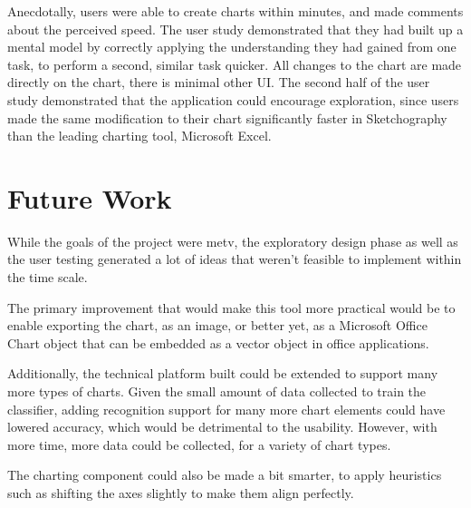 	Anecdotally, users were able to create charts within minutes, and made comments about the perceived speed. The user study demonstrated that they had built up a mental model by correctly applying the understanding they had gained from one task, to perform a second, similar task quicker. All changes to the chart are made directly on the chart, there is minimal other UI. The second half of the user study demonstrated that the application could encourage exploration, since users made the same modification to their chart significantly faster in Sketchography than the leading charting tool, Microsoft Excel.
	
\section{Future Work}
While the goals of the project were metv, the exploratory design phase as well as the user testing generated a lot of ideas that weren't feasible to implement within the time scale.

The primary improvement that would make this tool more practical would be to enable exporting the chart, as an image, or better yet, as a Microsoft Office Chart object that can be embedded as a vector object in office applications.

Additionally, the technical platform built could be extended to support many more types of charts. Given the small amount of data collected to train the classifier, adding recognition support for many more chart elements could have lowered accuracy, which would be detrimental to the usability. However, with more time, more data could be collected, for a variety of chart types.

The charting component could also be made a bit smarter, to apply heuristics such as shifting the axes slightly to make them align perfectly.